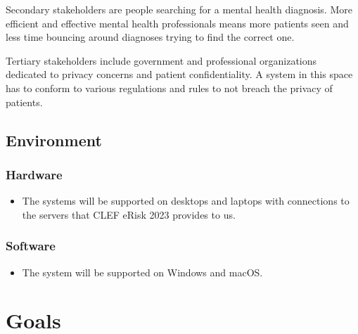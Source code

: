 \documentclass{article}
\begin{document}
Secondary stakeholders are people searching for a mental health diagnosis. More efficient and effective mental health professionals means more patients seen and less time bouncing around diagnoses trying to find the correct one.

Tertiary stakeholders include government and professional organizations  dedicated to privacy concerns and patient confidentiality. A system in this space has to conform to various regulations and rules to not breach the privacy of patients.

%

\subsection{Environment}
\subsubsection{Hardware}
\begin{itemize}
    \item The systems will be supported on desktops and laptops with connections to the servers that CLEF eRisk 2023 provides to us. 
\end{itemize}

\subsubsection{Software}
\begin{itemize}
    \item The system will be supported on Windows and macOS. 
\end{itemize}

\section{Goals}
\end{document}
